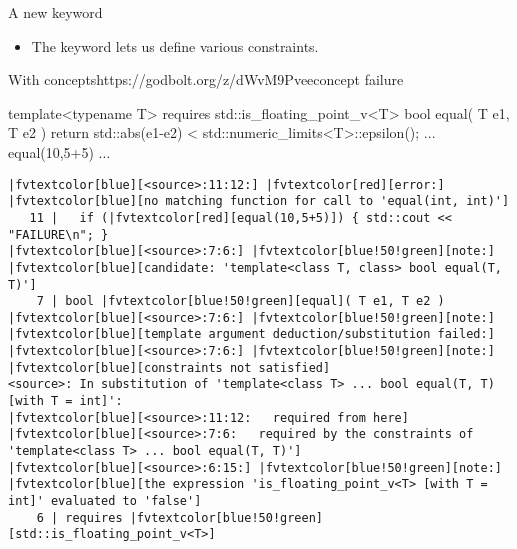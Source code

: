 \begin{frame}[fragile]
  \begin{block}{A new keyword}
    \begin{itemize}
      \item The keyword  lets us define various constraints.
    \end{itemize}
  \end{block}
  \begin{exampleblockGB}{With concepts}{https://godbolt.org/z/dWvM9Pvee}{concept failure}
    \scriptsize
    \begin{cppcode*}{}
    template<typename T>
    requires std::is_floating_point_v<T>
    bool equal( T e1, T e2 ) {
      return std::abs(e1-e2) < std::numeric_limits<T>::epsilon();
    }
    ... equal(10,5+5) ...
    \end{cppcode*}
    \pause
    \tiny
    \begin{Verbatim}[commandchars=\|\[\]]
|fvtextcolor[blue][<source>:11:12:] |fvtextcolor[red][error:] |fvtextcolor[blue][no matching function for call to 'equal(int, int)']
   11 |   if (|fvtextcolor[red][equal(10,5+5)]) { std::cout << "FAILURE\n"; }
|fvtextcolor[blue][<source>:7:6:] |fvtextcolor[blue!50!green][note:] |fvtextcolor[blue][candidate: 'template<class T, class> bool equal(T, T)']
    7 | bool |fvtextcolor[blue!50!green][equal]( T e1, T e2 )
|fvtextcolor[blue][<source>:7:6:] |fvtextcolor[blue!50!green][note:]   |fvtextcolor[blue][template argument deduction/substitution failed:]
|fvtextcolor[blue][<source>:7:6:] |fvtextcolor[blue!50!green][note:] |fvtextcolor[blue][constraints not satisfied]
<source>: In substitution of 'template<class T> ... bool equal(T, T) [with T = int]':
|fvtextcolor[blue][<source>:11:12:   required from here]
|fvtextcolor[blue][<source>:7:6:   required by the constraints of 'template<class T> ... bool equal(T, T)']
|fvtextcolor[blue][<source>:6:15:] |fvtextcolor[blue!50!green][note:] |fvtextcolor[blue][the expression 'is_floating_point_v<T> [with T = int]' evaluated to 'false']
    6 | requires |fvtextcolor[blue!50!green][std::is_floating_point_v<T>]
    \end{Verbatim}
  \end{exampleblockGB}
\end{frame}

